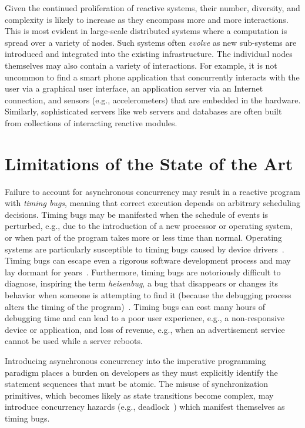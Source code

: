 Given the continued proliferation of reactive systems, their number, diversity, and complexity is likely to increase as they encompass more and more interactions.
This is most evident in large-scale distributed systems where a computation is spread over a variety of nodes.
Such systems often \emph{evolve} as new sub-systems are introduced and integrated into the existing infrastructure.
The individual nodes themselves may also contain a variety of interactions.
For example, it is not uncommon to find a smart phone application that concurrently interacts with the user via a graphical user interface, an application server via an Internet connection, and sensors (e.g., accelerometers) that are embedded in the hardware.
Similarly, sophisticated servers like web servers and databases are often built from collections of interacting reactive modules.

\section{Limitations of the State of the Art}
\label{limitations}

Failure to account for asynchronous concurrency may result in a reactive program with \emph{timing bugs}, meaning that correct execution depends on arbitrary scheduling decisions.
Timing bugs may be manifested when the schedule of events is perturbed, e.g., due to the introduction of a new processor or operating system, or when part of the program takes more or less time than normal.
Operating systems are particularly susceptible to timing bugs caused by device drivers~\cite{ryzhyk2009dingo}.
Timing bugs can escape even a rigorous software development process and may lay dormant for years~\cite{lee2006problem}.
Furthermore, timing bugs are notoriously difficult to diagnose, inspiring the term \emph{heisenbug}, a bug that disappears or changes its behavior when someone is attempting to find it (because the debugging process alters the timing of the program)~\cite{1983proceedings}.
Timing bugs can cost many hours of debugging time and can lead to a poor user experience, e.g., a non-responsive device or application, and loss of revenue, e.g., when an advertisement service cannot be used while a server reboots.

Introducing asynchronous concurrency into the imperative programming paradigm places a burden on developers as they must explicitly identify the statement sequences that must be atomic.
The misuse of synchronization primitives, which becomes likely as state transitions become complex, may introduce concurrency hazards (e.g., deadlock~\cite{dijkstra1965cooperating}) which manifest themselves as timing bugs.

